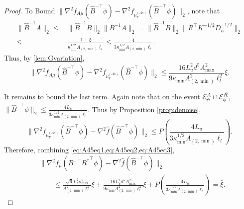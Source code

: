 \begin{proof}
	To Bound $\|\nabla^2 f_{A\mu}(\hat{B}^{-\top}\phi) - \nabla^2 f_{\nu_T^{(As)}}(\hat{B}^{-\top}\phi)\|_2$, note that 
	\begin{align*}
	\|\hat{B}^{-1}A\|_2\le & \, \|\hat{B}^{-1}B\|_2\|B^{-1}A\|_2 
	= \|\hat{B}^{-1}B\|_2\|R^{\top}K^{-1/2}D_{\psi}^{-1/2}\|_2 \\
	\le & \,\frac{1+\bar{\xi}}{\kappa_{\min}^{1/2}A_{(2,\min)}\ell_l}
	\le \frac{4}{3\kappa_{\min}^{1/2}A_{(2,\min)}\ell_l}.
	\end{align*}
	Thus, by \cref{lem:Gvariation},
	\begin{equation}
	\label{eq:A45eq2}
	\|\nabla^2 f_{A\mu}(\hat{B}^{-\top}\phi) - \nabla^2 f_{\nu_T^{(As)}}(\hat{B}^{-\top}\phi)\|_2 \le \frac{16L_u^2d^5A^2_{\max}}{9\kappa_{\min}A^2_{(2,\min)}\ell_l^2}\xi.
	\end{equation}
	
	It remains to bound the last term. 
	Again note that on the event $\mathcal{E}^A_{\psi}\cap\mathcal{E}^{\tilde{R}}_{\phi}$, $\|\hat{B}^{-\top}\phi\|_2 \le \frac{4L_u}{3\kappa_{\min}^{1/2}A_{(2,\min)}\ell_l}$. 
	Thus by Proposition \ref{prop:denoise}, 
	\begin{equation}
	\label{eq:A45eq3}
	\|\nabla^2 f_{\nu_T^{(As)}}(\hat{B}^{-\top}\phi) - \nabla^2 \widehat{f}(\hat{B}^{-\top}\phi)  \|_2 \le P\left(\frac{4L_u}{3\kappa_{\min}^{1/2}A_{(2,\min)}\ell_l}\right).
	\end{equation}
	Therefore, combining \cref{eq:A45eq1,eq:A45eq2,eq:A45eq3},
	\begin{align*}
	& \|\nabla^2 f_{\mu}(B^{-\top}{R^*}^{\top}\phi) - \nabla^2 \hat{f}(\hat{B}^{-\top}\phi)  \|_2 \\
	& \qquad \le 
	\frac{\sqrt{6}L_u^2\sigma_{\max}^2}{A^2_{(2,\min)}\ell_l^2}\bar{\xi}
	+
	\frac{16L_u^2d^5A^2_{\max}}{9\kappa_{\min}A^2_{(2,\min)}\ell_l^2}\xi
	+
	P\left(\frac{4L_u}{3\kappa_{\min}^{1/2}A_{(2,\min)}\ell_l}\right) = \hat{\xi}.
	\end{align*}
\end{proof}

